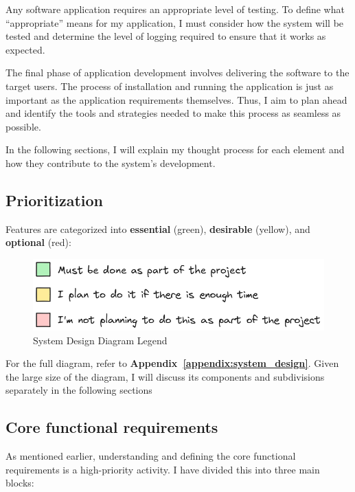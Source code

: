 \documentclass[10pt , a4paper]{report}
\begin{document}
Any software application requires an appropriate level of testing. To define what ``appropriate'' means for my application, I must consider how the system will be tested and determine the level of logging required to ensure that it works as expected.

The final phase of application development involves delivering the software to the target users. The process of installation and running the application is just as important as the application requirements themselves. Thus, I aim to plan ahead and identify the tools and strategies needed to make this process as seamless as possible.

In the following sections, I will explain my thought process for each element and how they contribute to the system's development.

\newpage

\subsection{Prioritization}
Features are categorized into \textbf{essential} (green), \textbf{desirable} (yellow), and \textbf{optional} (red):
\begin{figure}[htbp]
    \centering
    \includegraphics[width=.6\linewidth]{imgs/DesignLegend.png}
    \caption{System Design Diagram Legend}
    \label{fig:design_legend}
\end{figure}

For the full diagram, refer to \textbf{Appendix~\ref{appendix:system_design}}. Given the large size of the diagram, I will discuss its components and subdivisions separately in the following sections

\subsection{Core functional requirements}

As mentioned earlier, understanding and defining the core functional requirements is a high-priority activity. I have divided this into three main blocks:
\end{document}
